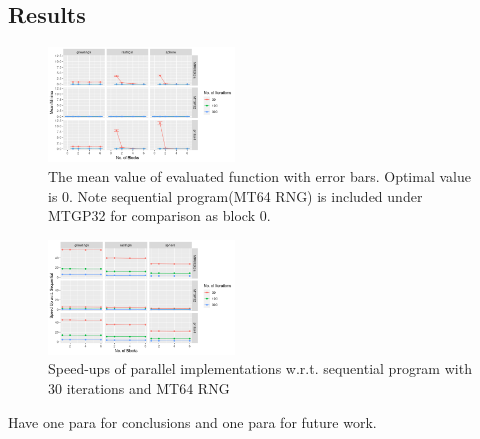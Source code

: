 \documentclass[conference]{IEEEtran}
\begin{document}
\subsection{Results}

\begin{figure}[ht]
    \centering
    \includegraphics[width=0.44\textwidth]{fitness}
    \caption{The mean value of evaluated function with error bars. Optimal value is 0. Note sequential program(MT64 RNG) is included under MTGP32 for comparison as block 0.}
\end{figure}

\begin{figure}[ht]
\centering
\includegraphics[width=0.44\textwidth]{speed_up}
\caption{Speed-ups of parallel implementations w.r.t. sequential program with 30 iterations and MT64 RNG}
\end{figure}

Have one para for conclusions and one para for future work.



\end{document}
